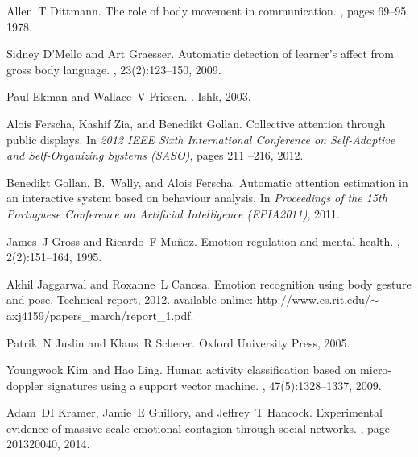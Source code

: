 \documentclass[12pt]{article}
\begin{document}
\begin{small}
\begin{thebibliography}{10}
Allen~T Dittmann.
\newblock The role of body movement in communication.
, pages 69--95, 1978.

Sidney D'Mello and Art Graesser.
\newblock Automatic detection of learner's affect from gross body language.
, 23(2):123--150, 2009.

Paul Ekman and Wallace~V Friesen.
.
\newblock Ishk, 2003.

Alois Ferscha, Kashif Zia, and Benedikt Gollan.
\newblock Collective attention through public displays.
\newblock In {\em 2012 IEEE Sixth International Conference on Self-Adaptive and
  Self-Organizing Systems (SASO)}, pages 211 --216, 2012.

Benedikt Gollan, B.~Wally, and Alois Ferscha.
\newblock Automatic attention estimation in an interactive system based on
  behaviour analysis.
\newblock In {\em Proceedings of the 15th Portuguese Conference on Artificial
  Intelligence (EPIA2011)}, 2011.

James~J Gross and Ricardo~F Mu{\~n}oz.
\newblock Emotion regulation and mental health.
, 2(2):151--164, 1995.

Akhil Jaggarwal and Roxanne~L Canosa.
\newblock Emotion recognition using body gesture and pose.
\newblock Technical report, 2012.
\newblock available online:
  http://www.cs.rit.edu/$\sim$axj4159/papers\_march/report\_1.pdf.

Patrik~N Juslin and Klaus~R Scherer.
\newblock Oxford University Press, 2005.

Youngwook Kim and Hao Ling.
\newblock Human activity classification based on micro-doppler signatures using
  a support vector machine.
,
  47(5):1328--1337, 2009.

Adam~DI Kramer, Jamie~E Guillory, and Jeffrey~T Hancock.
\newblock Experimental evidence of massive-scale emotional contagion through
  social networks.
, page
  201320040, 2014.


\end{thebibliography}
\end{small}
\end{document}
